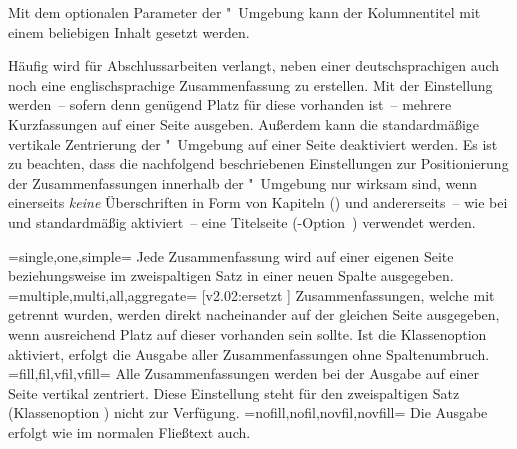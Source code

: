 \begin{DeclareEntity*}{}
\begin{DeclareEntity*}{}
\begin{DeclareEntity*}{}
\begin{Declaration}
Mit dem optionalen Parameter  der 
"~Umgebung kann der Kolumnentitel mit einem beliebigen 
Inhalt gesetzt werden.

Häufig wird für Abschlussarbeiten verlangt, neben einer deutschsprachigen auch 
noch eine englischsprachige Zusammenfassung zu erstellen. Mit der Einstellung 
 werden~-- sofern denn genügend Platz für diese 
vorhanden ist~-- mehrere Kurzfassungen auf einer Seite ausgeben. Außerdem kann 
die standardmäßige vertikale Zentrierung der "~Umgebung 
auf einer Seite deaktiviert werden. Es ist zu beachten, dass die nachfolgend 
beschriebenen Einstellungen zur Positionierung der Zusammenfassungen innerhalb 
der "~Umgebung nur wirksam sind, wenn einerseits 
\emph{keine} Überschriften in Form von Kapiteln ()
und andererseits~-- wie bei  und  
standardmäßig aktiviert~-- eine Titelseite 
(\KOMAScript-Option~) verwendet werden.
\begin{DeclareValues}
\itemval=single,one,simple=
  Jede Zusammenfassung wird auf einer eigenen Seite
  beziehungsweise im zweispaltigen Satz in einer neuen Spalte ausgegeben.
\itemval=multiple,multi,all,aggregate=%
    [v2.02:ersetzt ]
  Zusammenfassungen, welche mit  getrennt wurden, werden 
  direkt nacheinander auf der gleichen Seite ausgegeben, wenn ausreichend Platz 
  auf dieser vorhanden sein sollte. Ist die Klassenoption  
  aktiviert, erfolgt die Ausgabe aller Zusammenfassungen ohne Spaltenumbruch.
\itemval=fill,fil,vfil,vfill=
  Alle Zusammenfassungen werden bei der Ausgabe auf einer Seite vertikal 
  zentriert. Diese Einstellung steht für den zweispaltigen Satz
  (Klassenoption ) nicht zur Verfügung.
\itemval=nofill,nofil,novfil,novfill=
  Die Ausgabe erfolgt wie im normalen Fließtext auch.
\end{DeclareValues}
\end{Declaration}


\end{DeclareEntity*}
\end{DeclareEntity*}
\end{DeclareEntity*}
